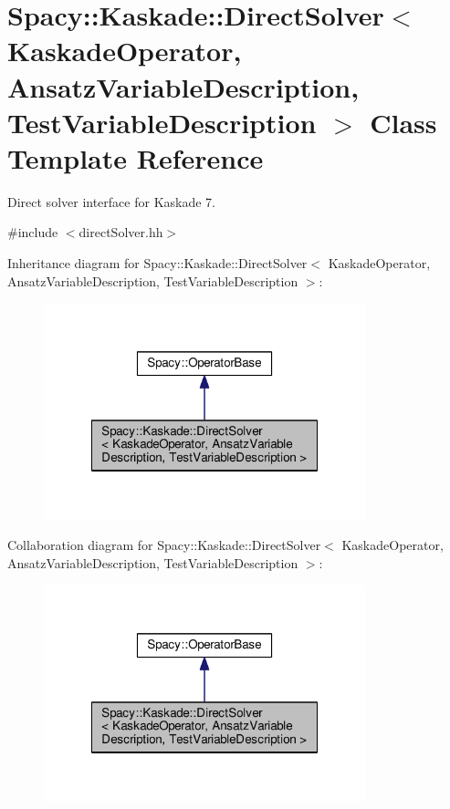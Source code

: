 \hypertarget{classSpacy_1_1Kaskade_1_1DirectSolver}{\section{Spacy\-:\-:Kaskade\-:\-:Direct\-Solver$<$ Kaskade\-Operator, Ansatz\-Variable\-Description, Test\-Variable\-Description $>$ Class Template Reference}
\label{classSpacy_1_1Kaskade_1_1DirectSolver}
}


Direct solver interface for Kaskade 7.  




{\ttfamily \#include $<$direct\-Solver.\-hh$>$}



Inheritance diagram for Spacy\-:\-:Kaskade\-:\-:Direct\-Solver$<$ Kaskade\-Operator, Ansatz\-Variable\-Description, Test\-Variable\-Description $>$\-:
\nopagebreak
\begin{figure}[H]
\begin{center}
\leavevmode
\includegraphics[width=264pt]{classSpacy_1_1Kaskade_1_1DirectSolver__inherit__graph}
\end{center}
\end{figure}


Collaboration diagram for Spacy\-:\-:Kaskade\-:\-:Direct\-Solver$<$ Kaskade\-Operator, Ansatz\-Variable\-Description, Test\-Variable\-Description $>$\-:
\nopagebreak
\begin{figure}[H]
\begin{center}
\leavevmode
\includegraphics[width=264pt]{classSpacy_1_1Kaskade_1_1DirectSolver__coll__graph}
\end{center}
\end{figure}
